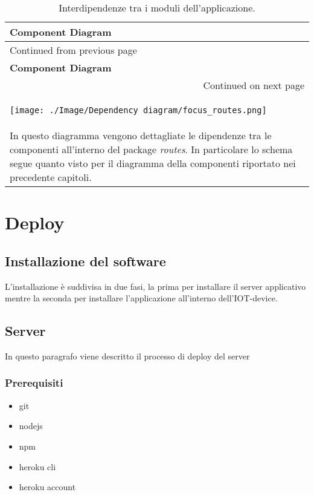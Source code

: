 \documentclass[onecolumn,a4paper]{article}
\begin{document}
\begin{longtable}{|p{13cm}|}
\caption{Interdipendenze tra i moduli dell'applicazione.}
\\
\cellcolor{grey!15} \textbf{Component Diagram}\\
\hline
\endfirsthead
\multicolumn{1}{l}{Continued from previous page} \\
\hline

\cellcolor{grey!15} \textbf{Component Diagram} \\

\hline
\endhead
\hline\multicolumn{1}{r}{Continued on next page} \\
\endfoot
\endlastfoot
\hline
\begin{center}
\texttt{[image: ./Image/Dependency diagram/focus\_routes.png]}
\end{center}\\
\hline
In questo diagramma vengono dettagliate le dipendenze tra le componenti all'interno del package \emph{routes}. In particolare lo schema segue quanto visto per il diagramma della componenti riportato nei precedente capitoli.\\
\hline
\end{longtable}

\section{Deploy}
\label{sec:org1ac45e6}
\subsection{Installazione del software}
\label{sec:orgfc08e77}
L'installazione è suddivisa in due fasi, la prima per installare il server applicativo mentre la seconda per installare l'applicazione all'interno dell'IOT-device. 

\subsection{Server}
\label{sec:orgc8d9b17}
In questo paragrafo viene descritto il processo di deploy del server
\subsubsection{Prerequisiti}
\label{sec:org517f408}
\begin{itemize}
\item git
\item nodejs
\item npm
\item heroku cli
\item heroku account
\end{itemize}
\end{document}
